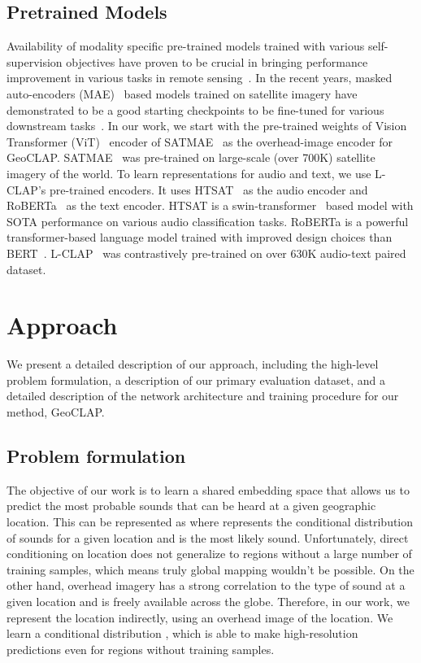 \documentclass{bmvc2k}
\begin{document}
\subsection{Pretrained Models}
Availability of modality specific pre-trained models trained with various self-supervision objectives have proven to be crucial in bringing performance improvement in various tasks in remote sensing~\cite{wang2022self}. In the recent years, masked auto-encoders (MAE)~\cite{he2022masked} based models trained on satellite imagery have demonstrated to be a good starting checkpoints to be fine-tuned for various downstream tasks~\cite{cong2022satmae,reed2022scale}. In our work, we start with the pre-trained weights of Vision Transformer (ViT)~\cite{dosovitskiy2020vit} encoder of SATMAE~\cite{cong2022satmae} as the overhead-image encoder for GeoCLAP. SATMAE~\cite{cong2022satmae} was pre-trained on large-scale (over 700K) satellite imagery of the world.
To learn representations for audio and text, we use L-CLAP's pre-trained encoders. It uses HTSAT~\cite{chen2022hts} as the audio encoder and RoBERTa~\cite{liu2019roberta} as the text encoder. HTSAT is a swin-transformer~\cite{liu2021swin} based model with SOTA performance on various audio classification tasks. RoBERTa is a powerful transformer-based language model trained with improved design choices than BERT~\cite{devlin2018bert}. L-CLAP~\cite{laionclap2023} was contrastively pre-trained on over 630K audio-text paired dataset.

\section{Approach}
\label{sec:approach}

We present a detailed description of our approach, including the high-level problem formulation, a description of our primary evaluation dataset, and a detailed description of the network architecture and training procedure for our method, GeoCLAP.

\subsection{Problem formulation}

The objective of our work is to learn a shared embedding space that allows us to predict the most probable sounds that can be heard at a given geographic location. This can be represented as  where  represents the conditional distribution of sounds for a given location  and  is the most likely sound. Unfortunately, direct conditioning on location does not generalize to regions without a large number of training samples, which means truly global mapping wouldn't be possible. On the other hand, overhead imagery has a strong correlation to the type of sound at a given location and is freely available across the globe. Therefore, in our work, we represent the location indirectly, using an overhead image  of the location. We learn a conditional distribution , which is able to make high-resolution predictions even for regions without training samples.
\end{document}
